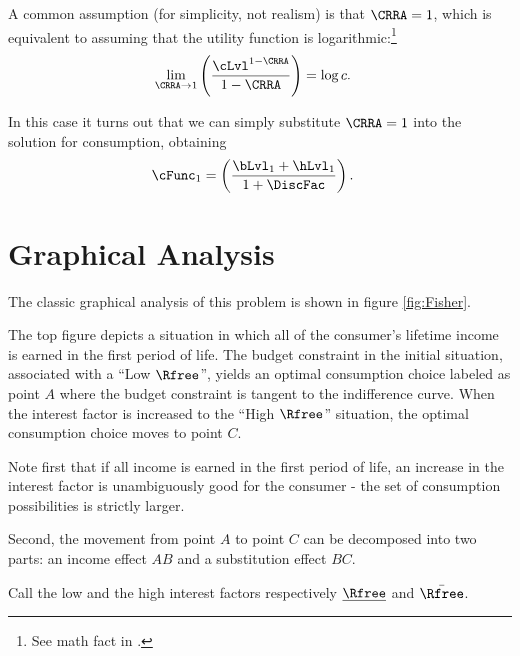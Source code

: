 \documentclass{scrartcl}
\begin{document}
  A common assumption (for simplicity, not realism) is that $\CRRA=1$, which is equivalent to assuming that the utility function is logarithmic:\footnote{See math fact \CRRALim in \MathFactsList.}
  \begin{equation}\begin{gathered}\begin{aligned} \lim_{\CRRA \rightarrow 1} \left(\frac{\cLvl^{1-\CRRA}}{1-\CRRA}\right) & = \log c.
      \end{aligned}\end{gathered}\end{equation}

  In this case it turns out that we can simply substitute $\CRRA=1$ into the solution for consumption, obtaining
  \begin{equation}\begin{gathered}\begin{aligned} \cFunc_{1} & = \left(\frac{\bLvl_{1}+\hLvl_{1}}{1+\DiscFac}\right).
      \end{aligned}\end{gathered}\end{equation}


  \section{Graphical Analysis}

  The classic graphical analysis of this problem is shown in figure \ref{fig:Fisher}.

  The top figure depicts a situation in which all of the consumer's lifetime income is earned in the first period of life.
  The budget constraint in the initial situation, associated with a ``Low $\Rfree$'', yields an optimal consumption choice labeled as point $A$ where the budget constraint is tangent to the indifference curve.
  When the interest factor is increased to the ``High $\Rfree$'' situation, the optimal consumption choice moves to point $C$.

  Note first that if all income is earned in the first period of life, an increase in the interest factor is unambiguously good for the consumer - the set of consumption possibilities is strictly larger.

  Second, the movement from point $A$ to point $C$ can be decomposed into two parts: an income effect $AB$ and a substitution effect $BC$.

  Call the low and the high interest factors respectively $\underline{\Rfree}$ and $\bar{\Rfree}$.
\end{document}
